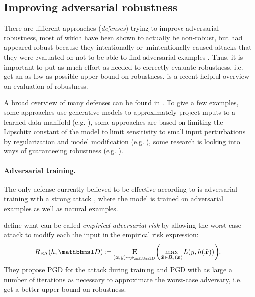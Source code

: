 \documentclass[twocolumn]{article}
\begin{document}
\subsection{Improving adversarial robustness}

There are different approaches (\textit{defenses}) trying to improve adversarial robustness, most of which have been shown to actually be non-robust, but had appeared robust because they intentionally or unintentionally caused attacks that they were evaluated on not to be able to find adversarial examples \citep{Carlini:2017:AEANEDBTM,Athalye:2018:OGGFSS,Uesato:2018:ARDEAWA,Carlini:2017:TERNN}.  Thus, it is important to put as much effort as needed to correctly evaluate robustness, i.e. get an as low as possible upper bound on robustness. \citep{Carlini:2019:OEAR} is a recent helpful overview on evaluation of robustness. 

A broad overview of many defenses can be found in \citet{Serban:2018:AECCP}. To give a few examples, some approaches use generative models to approximately project inputs to a learned data manifold (e.g. \citet{Samangouei:2018:DGPCAAAUGM}), some approaches are based on limiting the Lipschitz constant of the model to limit sensitivity to small input perturbations by regularization and model modification (e.g. \citet{Qian:2018:L2NNN}), some research is looking into ways of guaranteeing robustness (e.g. \citet{Cohen:2019:CARRS}).

\paragraph{Adversarial training.} The only defense currently believed to be effective according to \citet{Athalye:2018:OGGFSS} is adversarial training \citep{Goodfellow:2014:EHAE} with a strong attack \citep{Madry:2017:TDLMRAA}, where the model is trained on adversarial examples as well as natural examples.

\cite{Madry:2017:TDLMRAA} define what can be called \textit{empirical adversarial risk} by allowing the worst-case attack to modify each the input in the empirical risk expression:
\begin{align}
R_\text{EA}(h,\set D) \coloneqq \E_{(\vec x, y)\sim p_{\set D}} \del{\max_{\tilde{\vec x}\in B_\epsilon(\vec x)} L(y,h(\tilde{\vec x}))} \text{.}
\end{align}
They propose PGD for the attack during training and PGD with as large a number of iterations as necessary to approximate the worst-case adversary, i.e. get a better upper bound on robustness.
\end{document}
